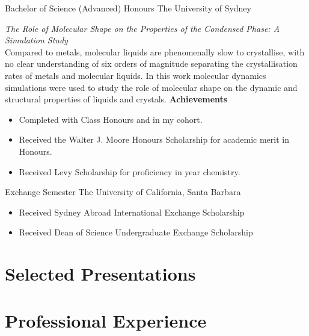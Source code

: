 {Bachelor of Science (Advanced) Honours}
{The University of Sydney}{}{}
{%
  \emph{The Role of Molecular Shape on the Properties of the Condensed Phase: A Simulation Study}\\
  Compared to metals, molecular liquids are phenomenally slow to crystallise, with no clear
  understanding of six orders of magnitude separating the crystallisation rates of metals and
  molecular liquids.
  In this work molecular dynamics simulations were used to study the role of molecular shape on the
  dynamic and structural properties of liquids and crystals.
  \textbf{Achievements}
  \begin{itemize}
    \item Completed with  Class Honours and  in my cohort.
    \item Received the Walter J. Moore Honours Scholarship for academic merit in Honours.
    \item Received Levy Scholarship for proficiency in  year chemistry.
  \end{itemize}
}
\vspace{1em}

{Exchange Semester}
{The University of California, Santa Barbara}{}{}
{%
\begin{itemize}
  \item Received Sydney Abroad International Exchange Scholarship
  \item Received Dean of Science Undergraduate Exchange Scholarship
\end{itemize}
}

\nocite{*}
\printbibliography[title={Selected Publications}]

\section{Selected Presentations}


\section{Professional Experience}


